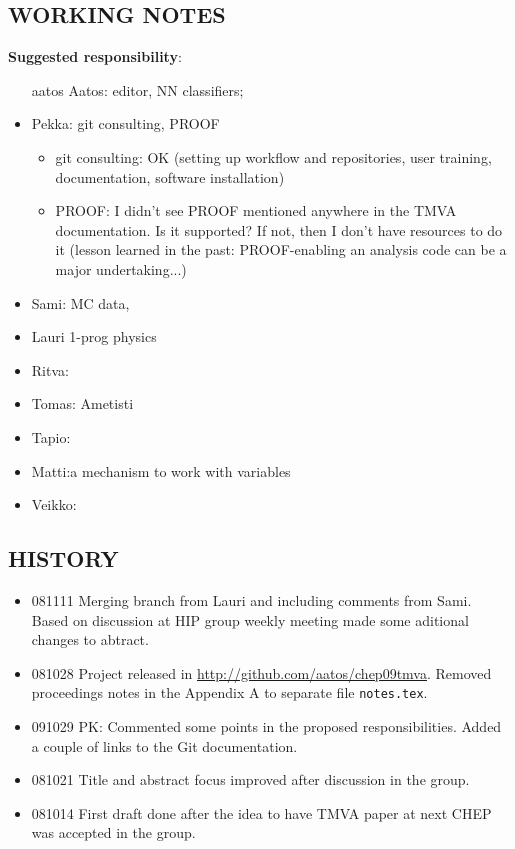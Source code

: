 \begin{appendix}
\section{WORKING NOTES}
{\bf Suggested  responsibility}: 
\begin{itemize}
\item[aatos]
Aatos: editor, NN classifiers; 
\item Pekka: git consulting, PROOF
\begin{itemize}
\item git consulting: OK (setting up workflow and repositories, user
  training, documentation, software installation)
\item PROOF: I didn't see PROOF mentioned anywhere in the TMVA
  documentation. Is it supported? If not, then I don't have resources
  to do it (lesson learned in the past: PROOF-enabling an analysis
  code can be a major undertaking...)
\end{itemize}
\item Sami: MC data, 
\item Lauri 1-prog physics
\item Ritva: 
\item Tomas: Ametisti
\item Tapio: 
\item Matti:a mechanism to work with variables 
\item Veikko:
\end{itemize}
\subsection{HISTORY}
\begin{itemize}
\item 081111 Merging branch from Lauri and including comments from Sami. 
Based on discussion at HIP group weekly meeting made some aditional changes to abtract.
\item 081028 Project released in \url{http://github.com/aatos/chep09tmva}. Removed proceedings notes in the Appendix A to separate file {\tt notes.tex}.
\item 091029 PK: Commented some points in the proposed
  responsibilities. Added a couple of links to the Git documentation.
\item 081021 Title and abstract focus improved after discussion in the group. 
\item 081014 First draft done after the idea to have TMVA paper at next CHEP was accepted in the group.
\end{itemize}


\end{appendix}
